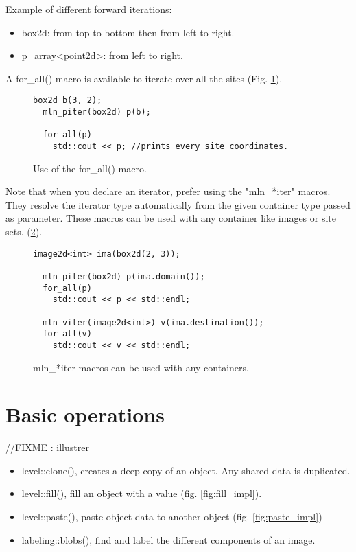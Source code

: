 \documentclass{report}
\begin{document}
Example of different forward iterations:
\begin{itemize}
  \item box2d: from top to bottom then from left to right.
  \item p\_array<point2d>: from left to right.
\end{itemize}

A for\_all() macro is available to iterate over all the sites
(Fig. \ref{fig:for_all}). \\


\begin{figure}[ht!]
  \begin{lstlisting}[frame=single]
  box2d b(3, 2);
  mln_piter(box2d) p(b);

  for_all(p)
    std::cout << p; //prints every site coordinates.
  \end{lstlisting}
  \caption{Use of the for\_all() macro.\label{fig:for_all}}
\end{figure}

Note that when you declare an iterator, prefer using the "mln\_*iter" macros.
They resolve the iterator type automatically from the given container type
passed as parameter. These macros can be used with any container like images or
site sets.
(\ref{fig:iter_allcontainers}).

\begin{figure}[ht!]
  \begin{lstlisting}[frame=single]
  image2d<int> ima(box2d(2, 3));

  mln_piter(box2d) p(ima.domain());
  for_all(p)
    std::cout << p << std::endl;

  mln_viter(image2d<int>) v(ima.destination());
  for_all(v)
    std::cout << v << std::endl;
  \end{lstlisting}
  \caption{mln\_*iter macros can be used with any
containers.\label{fig:iter_allcontainers}}
\end{figure} 


\chapter{Basic operations}
//FIXME : illustrer
\begin{itemize}
  \item level::clone(), creates a deep copy of an object. Any shared data is
duplicated.
  \item level::fill(), fill an object with a value (fig. \ref{fig:fill_impl}).
  \item level::paste(), paste object data to another object (fig.
\ref{fig:paste_impl})

  \item labeling::blobs(), find and label the different components of an image.
\end{itemize}
\end{document}
